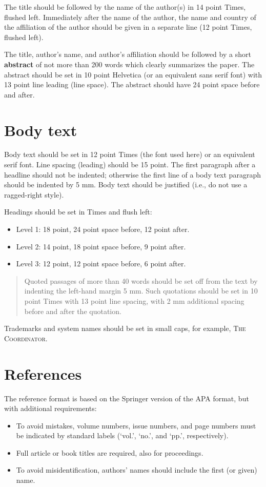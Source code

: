 \documentclass{ecscw2007}
\begin{document}
The title should be followed by the name of the author(s) in 14 point Times, flushed left. Immediately after the name of the author, the name and country of the affiliation of the author should be given in a separate line (12 point Times, flushed left).

The title, author's name, and author's affiliation should be followed by a short \textbf{abstract} of not more than 200 words which clearly summarizes the paper. The abstract should be set in 10 point Helvetica (or an equivalent sans serif font) with 13 point line leading (line space). The abstract should have 24 point space before and after.

\section*{Body text}

Body text should be set in 12 point Times (the font used here) or an equivalent serif font. Line spacing (leading) should be 15 point. The first paragraph after a headline should not be indented; otherwise the first line of a body text paragraph should be indented by 5 mm. Body text should be justified (i.e., do not use a ragged-right style).

Headings should be set in Times and flush left:
\begin{itemize}
\item Level 1: 18 point, 24 point space before, 12 point after.
\item Level 2: 14 point, 18 point space before, 9 point after.
\item Level 3: 12 point, 12 point space before, 6 point after.
\end{itemize}

\begin{quotation}
Quoted passages of more than 40 words should be set off from the text by indenting the left-hand margin 5 mm. Such quotations should be set in 10 point Times with 13 point line spacing, with 2 mm additional spacing before and after the quotation.
\end{quotation}

Trademarks and system names should be set in small caps, for example, \textsc{The Coordinator}.


\section*{References}

The reference format is based on the Springer version of the APA format, but with additional requirements:
\begin{itemize}
\item To avoid mistakes, volume numbers, issue numbers, and page numbers must be indicated by standard labels (`vol.', `no.', and `pp.', respectively).
\item Full article or book titles are required, also for proceedings.
\item To avoid misidentification, authors' names should include the first (or given) name.
\end{itemize}
\end{document}
